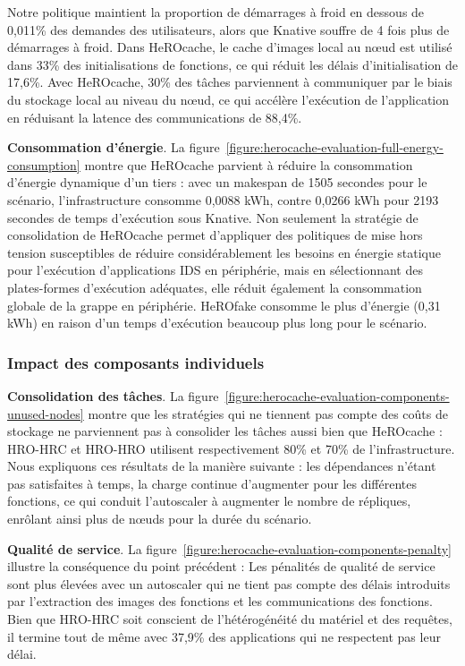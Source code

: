 Notre politique maintient la proportion de démarrages à froid en dessous de 0,011\% des demandes des utilisateurs, alors que Knative souffre de 4 fois plus de démarrages à froid. Dans HeROcache, le cache d'images local au nœud est utilisé dans 33\% des initialisations de fonctions, ce qui réduit les délais d'initialisation de 17,6\%.
Avec HeROcache, 30\% des tâches parviennent à communiquer par le biais du stockage local au niveau du nœud, ce qui accélère l'exécution de l'application en réduisant la latence des communications de 88,4\%.

\textbf{Consommation d'énergie}. La figure~\ref{figure:herocache-evaluation-full-energy-consumption} montre que HeROcache parvient à réduire la consommation d'énergie dynamique d'un tiers : avec un makespan de 1505 secondes pour le scénario, l'infrastructure consomme 0,0088 kWh, contre 0,0266 kWh pour 2193 secondes de temps d'exécution sous Knative. Non seulement la stratégie de consolidation de HeROcache permet d'appliquer des politiques de mise hors tension susceptibles de réduire considérablement les besoins en énergie statique pour l'exécution d'applications IDS en périphérie, mais en sélectionnant des plates-formes d'exécution adéquates, elle réduit également la consommation globale de la grappe en périphérie. HeROfake consomme le plus d'énergie (0,31 kWh) en raison d'un temps d'exécution beaucoup plus long pour le scénario.

\subsubsection{Impact des composants individuels}

\textbf{Consolidation des tâches}. La figure~\ref{figure:herocache-evaluation-components-unused-nodes} montre que les stratégies qui ne tiennent pas compte des coûts de stockage ne parviennent pas à consolider les tâches aussi bien que HeROcache : HRO-HRC et HRO-HRO utilisent respectivement 80\% et 70\% de l'infrastructure. Nous expliquons ces résultats de la manière suivante : les dépendances n'étant pas satisfaites à temps, la charge continue d'augmenter pour les différentes fonctions, ce qui conduit l'autoscaler à augmenter le nombre de répliques, enrôlant ainsi plus de nœuds pour la durée du scénario.

\textbf{Qualité de service}. La figure~\ref{figure:herocache-evaluation-components-penalty} illustre la conséquence du point précédent : Les pénalités de qualité de service sont plus élevées avec un autoscaler qui ne tient pas compte des délais introduits par l'extraction des images des fonctions et les communications des fonctions. Bien que HRO-HRC soit conscient de l'hétérogénéité du matériel et des requêtes, il termine tout de même avec 37,9\% des applications qui ne respectent pas leur délai.

